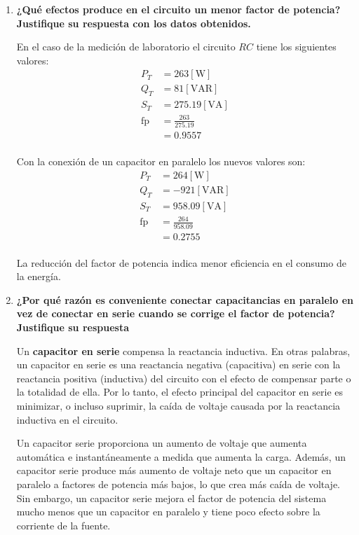 \documentclass[letter,11pt]{article}
\begin{document}
\begin{enumerate}
\item \textbf{¿Qué efectos produce en el circuito un menor factor de potencia?
Justifique su respuesta con los datos obtenidos.}

En el caso de la medición de laboratorio el circuito $RC$ tiene los siguientes
valores:
\begin{equation*}
    \begin{split}
        P_T &= 263[\text{W}]\\
        Q_T &= 81[\text{VAR}]\\
        S_T &= 275.19[\text{VA}]\\
        \text{fp} &= \frac{263}{275.19}\\
                  &= 0.9557\\
    \end{split}
\end{equation*}

Con la conexión de un capacitor en paralelo los nuevos valores son:
\begin{equation*}
    \begin{split}
        P_T &= 264[\text{W}]\\
        Q_T &= -921[\text{VAR}]\\
        S_T &= 958.09[\text{VA}]\\
        \text{fp} &= \frac{264}{958.09}\\
                  &= 0.2755\\
    \end{split}
\end{equation*}

La reducción del factor de potencia indica menor eficiencia en el consumo de la
energía.

\item \textbf{¿Por qué razón es conveniente conectar capacitancias en paralelo
en vez de conectar en serie cuando se corrige el factor de potencia? Justifique
su respuesta}

Un \textbf{capacitor en serie} compensa la reactancia inductiva. En otras
palabras, un capacitor en serie es una reactancia negativa (capacitiva) en serie
con la reactancia positiva (inductiva) del circuito con el efecto de compensar
parte o  la totalidad de ella. Por lo tanto, el efecto principal del capacitor
en serie es minimizar, o incluso suprimir, la caída de voltaje causada por la
reactancia inductiva en el circuito.

Un capacitor serie proporciona un aumento de voltaje que aumenta automática e
instantáneamente a medida que aumenta la carga. Además, un capacitor serie
produce más aumento de voltaje neto que un capacitor en paralelo a factores de
potencia más bajos, lo que crea más caída de voltaje. Sin embargo, un capacitor
serie mejora el factor de potencia del sistema mucho menos que un capacitor en
paralelo y tiene poco efecto sobre la corriente de la fuente.


\end{enumerate}
\end{document}
